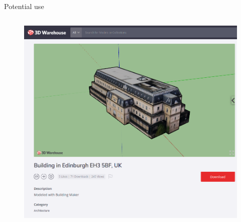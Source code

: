 \documentclass[10pt, export]{beamer}
\begin{document}
\begin{frame}{Potential use}
\begin{minipage}[0.2\textheight]{\textwidth}
\begin{columns}[T]
\begin{column}{0.48\textwidth}
{\begin{figure}
\begin{center}
                                    \includegraphics[width=\textwidth]{images/use/crowdsourcing}
                                \end{center}
                            \end{figure}
                        }
                    \end{column}
                \end{columns}
            \end{minipage}
        \end{frame}
\end{document}
